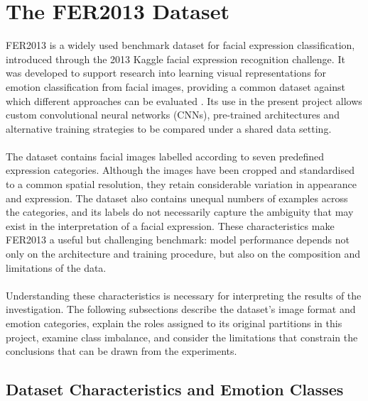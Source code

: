 \documentclass[12pt, a4paper]{report}
\let\oldsection\section
\renewcommand{\section}{%
    \Needspace{6\baselineskip}%
    \oldsection
}
\let\oldsubsection\subsection
\renewcommand{\subsection}{%
    \Needspace{6\baselineskip}%
    \oldsubsection
}
\begin{document}
		\section{The FER2013 Dataset}
			
			FER2013 is a widely used benchmark dataset for facial expression classification, introduced through the 2013 Kaggle facial expression recognition challenge. It was developed to support research into learning visual representations for emotion classification from facial images, providing a common dataset against which different approaches can be evaluated \cite{goodfellow2015challenges, fer2013_kaggle}. Its use in the present project allows custom convolutional neural networks (CNNs), pre-trained architectures and alternative training strategies to be compared under a shared data setting.\\\\
			The dataset contains facial images labelled according to seven predefined expression categories. Although the images have been cropped and standardised to a common spatial resolution, they retain considerable variation in appearance and expression. The dataset also contains unequal numbers of examples across the categories, and its labels do not necessarily capture the ambiguity that may exist in the interpretation of a facial expression. These characteristics make FER2013 a useful but challenging benchmark: model performance depends not only on the architecture and training procedure, but also on the composition and limitations of the data.\\\\
			Understanding these characteristics is necessary for interpreting the results of the investigation. The following subsections describe the dataset's image format and emotion categories, explain the roles assigned to its original partitions in this project, examine class imbalance, and consider the limitations that constrain the conclusions that can be drawn from the experiments.
			
			\subsection{Dataset Characteristics and Emotion Classes}
				
\end{document}
